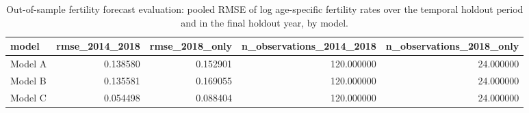 \begin{table}[ht]
\centering
\begin{tabular}{lrrrr}
\hline
model & rmse_2014_2018 & rmse_2018_only & n_observations_2014_2018 & n_observations_2018_only \\
\hline
Model A & 0.138580 & 0.152901 & 120.000000 & 24.000000 \\
Model B & 0.135581 & 0.169055 & 120.000000 & 24.000000 \\
Model C & 0.054498 & 0.088404 & 120.000000 & 24.000000 \\
\hline
\end{tabular}
\caption{Out-of-sample fertility forecast evaluation: pooled RMSE of log age-specific fertility rates over the temporal holdout period and in the final holdout year, by model.}
\label{tab:revised_table_7_4}
\end{table}

